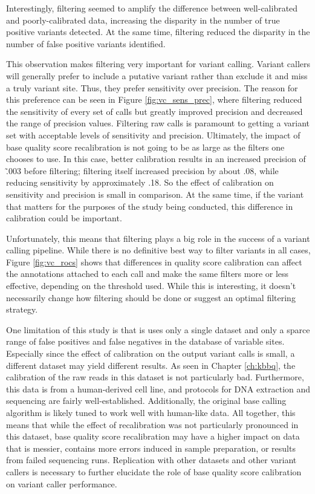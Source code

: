 Interestingly, filtering seemed to amplify the difference between well-calibrated and poorly-calibrated data, increasing the disparity in the number of true positive variants detected. At the same time, filtering reduced the disparity in the number of false positive variants identified.

This observation makes filtering very important for variant calling. Variant callers will generally prefer to include a putative variant rather than exclude it and miss a truly variant site. Thus, they prefer sensitivity over precision. The reason for this preference can be seen in Figure \ref{fig:vc_sens_prec}, where filtering reduced the sensitivity of every set of calls but greatly improved precision and decreased the range of precision values. Filtering raw calls is paramount to getting a variant set with acceptable levels of sensitivity and precision. Ultimately, the impact of base quality score recalibration is not going to be as large as the filters one chooses to use. In this case, better calibration results in an increased precision of \~.003 before filtering; filtering itself increased precision by about .08, while reducing sensitivity by approximately .18. So the effect of calibration on sensitivity and precision is small in comparison. At the same time, if the variant that matters for the purposes of the study being conducted, this difference in calibration could be important.

Unfortunately, this means that filtering plays a big role in the success of a variant calling pipeline. While there is no definitive best way to filter variants in all cases, Figure \ref{fig:vc_rocs} shows that differences in quality score calibration can affect the annotations attached to each call and make the same filters more or less effective, depending on the threshold used. While this is interesting, it doesn't necessarily change how filtering should be done or suggest an optimal filtering strategy.

One limitation of this study is that is uses only a single dataset and only a sparce range of false positives and false negatives in the database of variable sites. Especially since the effect of calibration on the output variant calls is small, a different dataset may yield different results. As seen in Chapter \ref{ch:kbbq}, the calibration of the raw reads in this dataset is not particularly bad. Furthermore, this data is from a human-derived cell line, and protocols for DNA extraction and sequencing are fairly well-established. Additionally, the original base calling algorithm is likely tuned to work well with human-like data. All together, this means that while the effect of recalibration was not particularly pronounced in this dataset, base quality score recalibration may have a higher impact on data that is messier, contains more errors induced in sample preparation, or results from failed sequencing runs. Replication with other datasets and other variant callers is necessary to further elucidate the role of base quality score calibration on variant caller performance.  

